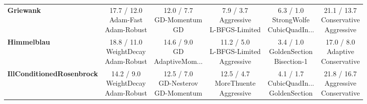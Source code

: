 \documentclass{article}
\begin{document}
\begin{longtable}{lccccc}
\textbf{Griewank} &  \makecell{17.7 / 12.0 \\ \scriptsize{Adam-Fast} \\ \scriptsize{Adam-Robust}}&  \makecell{12.0 / 7.7 \\ \scriptsize{GD-Momentum} \\ \scriptsize{GD}}&  \makecell{7.9 / 3.7 \\ \scriptsize{Aggressive} \\ \scriptsize{L-BFGS-Limited}}& \cellcolor{bestgreen!30} \makecell{6.3 / 1.0 \\ \scriptsize{StrongWolfe} \\ \scriptsize{CubicQuadIn...}}& \cellcolor{worstred!20} \makecell{21.1 / 13.7 \\ \scriptsize{Conservative} \\ \scriptsize{Aggressive}} \\
\textbf{Himmelblau} & \cellcolor{worstred!20} \makecell{18.8 / 11.0 \\ \scriptsize{WeightDecay} \\ \scriptsize{Adam-Robust}}&  \makecell{14.6 / 9.0 \\ \scriptsize{GD} \\ \scriptsize{AdaptiveMom...}}&  \makecell{11.2 / 5.0 \\ \scriptsize{L-BFGS-Limited} \\ \scriptsize{Aggressive}}& \cellcolor{bestgreen!30} \makecell{3.4 / 1.0 \\ \scriptsize{GoldenSection} \\ \scriptsize{Bisection-1}}&  \makecell{17.0 / 8.0 \\ \scriptsize{Adaptive} \\ \scriptsize{Conservative}} \\
\textbf{IllConditionedRosenbrock} &  \makecell{14.2 / 9.0 \\ \scriptsize{WeightDecay} \\ \scriptsize{Adam-Robust}}&  \makecell{12.5 / 7.0 \\ \scriptsize{GD-Nesterov} \\ \scriptsize{GD-Momentum}}&  \makecell{12.5 / 4.7 \\ \scriptsize{MoreThuente} \\ \scriptsize{Aggressive}}& \cellcolor{bestgreen!30} \makecell{4.1 / 1.7 \\ \scriptsize{CubicQuadIn...} \\ \scriptsize{GoldenSection}}& \cellcolor{worstred!20} \makecell{21.8 / 16.7 \\ \scriptsize{Aggressive} \\ \scriptsize{Conservative}} \\

\end{longtable}
\end{document}
